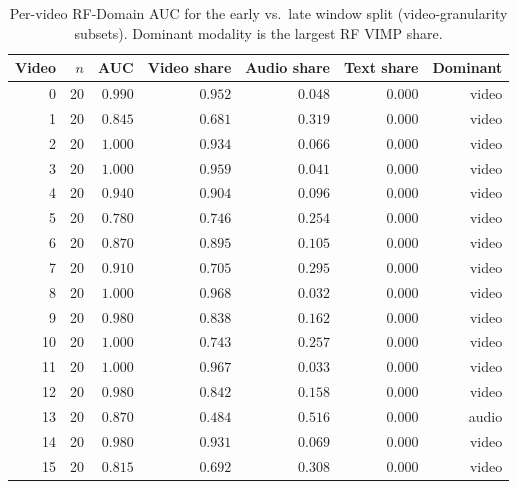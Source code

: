 \begin{table}[ht]\centering
\caption{Per-video RF-Domain AUC for the early vs.\ late window split (video-granularity subsets). Dominant modality is the largest RF VIMP share.}
\label{tab:msrvtt-mm-pervideo-auc}
\small
\begin{tabular}{@{}r r r r r r r@{}}\toprule
Video & $n$ & AUC & Video share & Audio share & Text share & Dominant \\
\midrule
0 & 20 & $0.990$ & $0.952$ & $0.048$ & $0.000$ & video \\
1 & 20 & $0.845$ & $0.681$ & $0.319$ & $0.000$ & video \\
2 & 20 & $1.000$ & $0.934$ & $0.066$ & $0.000$ & video \\
3 & 20 & $1.000$ & $0.959$ & $0.041$ & $0.000$ & video \\
4 & 20 & $0.940$ & $0.904$ & $0.096$ & $0.000$ & video \\
5 & 20 & $0.780$ & $0.746$ & $0.254$ & $0.000$ & video \\
6 & 20 & $0.870$ & $0.895$ & $0.105$ & $0.000$ & video \\
7 & 20 & $0.910$ & $0.705$ & $0.295$ & $0.000$ & video \\
8 & 20 & $1.000$ & $0.968$ & $0.032$ & $0.000$ & video \\
9 & 20 & $0.980$ & $0.838$ & $0.162$ & $0.000$ & video \\
10 & 20 & $1.000$ & $0.743$ & $0.257$ & $0.000$ & video \\
11 & 20 & $1.000$ & $0.967$ & $0.033$ & $0.000$ & video \\
12 & 20 & $0.980$ & $0.842$ & $0.158$ & $0.000$ & video \\
13 & 20 & $0.870$ & $0.484$ & $0.516$ & $0.000$ & audio \\
14 & 20 & $0.980$ & $0.931$ & $0.069$ & $0.000$ & video \\
15 & 20 & $0.815$ & $0.692$ & $0.308$ & $0.000$ & video \\
\bottomrule\end{tabular}\end{table}
